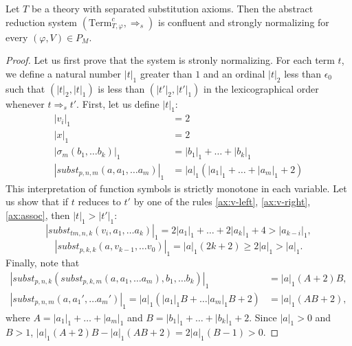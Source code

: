 \documentclass[reqno]{amsart}
\theoremstyle{definition}
\theoremstyle{remark}
\newcommand{\Term}{\mathrm{Term}}
\newcommand{\subst}{\mathit{subst}}
\newcommand{\tm}{\mathit{tm}}
\numberwithin{figure}{section}
\begin{document}
\begin{lem}
Let $T$ be a theory with separated substitution axioms.
Then the abstract reduction system $(\Term_{T,\varphi}^c,\Rightarrow_s)$ is confluent and strongly normalizing for every $(\varphi,V) \in P_M$.
\end{lem}
\begin{proof}
Let us first prove that the system is stronly normalizing.
For each term $t$, we define a natural number $|t|_1$ greater than $1$ and an ordinal $|t|_2$ less than $\epsilon_0$ such that $(|t|_2,|t|_1)$ is less than $(|t'|_2,|t'|_1)$ in the lexicographical order whenever $t \Rightarrow_s t'$.
First, let us define $|t|_1$:
\begin{align*}
|v_i|_1 & = 2 \\
|x|_1 & = 2 \\
|\sigma_m(b_1, \ldots b_k)|_1 & = |b_1|_1 + \ldots + |b_k|_1 \\
|\subst_{p,n,m}(a, a_1, \ldots a_m)|_1 & = |a|_1 (|a_1|_1 + \ldots + |a_m|_1 + 2)
\end{align*}
This interpretation of function symbols is strictly monotone in each variable.
Let us show that if $t$ reduces to $t'$ by one of the rules \eqref{ax:v-left}, \eqref{ax:v-right}, \eqref{ax:assoc}, then $|t|_1 > |t'|_1$:
\[ |\subst_{\tm,n,k}(v_i, a_1, \ldots a_k)|_1 = 2 |a_1|_1 + \ldots + 2 |a_k|_1 + 4 > |a_{k-i}|_1, \]
\[ |\subst_{p,k,k}(a, v_{k-1}, \ldots v_0)|_1 = |a|_1 (2 k + 2) \geq 2|a|_1 > |a|_1. \]
Finally, note that
\begin{align*}
|\subst_{p,n,k}(\subst_{p,k,m}(a, a_1, \ldots a_m), b_1, \ldots b_k)|_1 & = |a|_1 (A + 2) B, \\
|\subst_{p,n,m}(a, a_1', \ldots a_m')|_1 = |a|_1 (|a_1|_1 B + \ldots |a_m|_1 B + 2) & = |a|_1 (A B + 2),
\end{align*}
where $A = |a_1|_1 + \ldots + |a_m|_1$ and $B = |b_1|_1 + \ldots + |b_k|_1 + 2$.
Since $|a|_1 > 0$ and $B > 1$, $|a|_1 (A + 2) B - |a|_1 (A B + 2) = 2 |a|_1 (B - 1) > 0$.


\end{proof}
\end{document}
